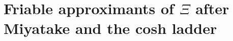 \chapter{Friable approximants of \texorpdfstring{$\Xi$}{Xi} after Miyatake and the cosh ladder}\label{vol2:ch17}






